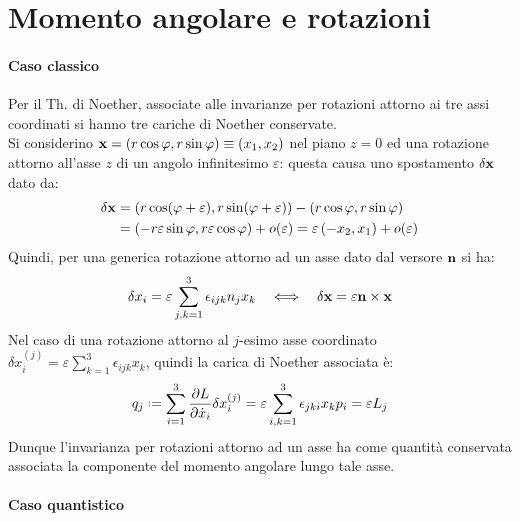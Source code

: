 
\section{Momento angolare e rotazioni}

\paragraph{Caso classico}

Per il Th. di Noether, associate alle invarianze per rotazioni attorno ai tre assi coordinati si hanno tre cariche di Noether conservate.\\
Si considerino $ \mathbf{x} = \left( r\cos \varphi, r\sin \varphi \right) \equiv \left( x_1, x_2 \right) $ nel piano $ z = 0 $ ed una rotazione attorno all'asse $ z $ di un angolo infinitesimo $ \varepsilon $: questa causa uno spostamento $ \delta\mathbf{x} $ dato da:
\begin{equation*}
	\begin{split}
		\delta\mathbf{x}
		&= \left( r\cos (\varphi + \varepsilon), r\sin (\varphi + \varepsilon) \right) - \left( r\cos \varphi, r\sin \varphi \right)\\
		&= \left( -r \varepsilon \sin \varphi, r \varepsilon \cos \varphi \right) + o(\varepsilon) = \varepsilon \left( -x_2, x_1 \right) + o(\varepsilon)
	\end{split}
\end{equation*}
Quindi, per una generica rotazione attorno ad un asse dato dal versore $ \mathbf{n} $ si ha:
\begin{equation}
	\delta x_i = \varepsilon \sum_{j,k = 1}^{3} \epsilon_{ijk} n_j x_k \quad\Longleftrightarrow\quad \delta\mathbf{x} = \varepsilon \mathbf{n}\times\mathbf{x}
	\label{eq:2.1}
\end{equation}
Nel caso di una rotazione attorno al $ j $-esimo asse coordinato $ \delta x_i^{(j)} = \varepsilon \sum_{k = 1}^{3} \epsilon_{ijk} x_k $, quindi la carica di Noether associata è:
\begin{equation}
	q_j \defeq \sum_{i = 1}^{3} \frac{\pa L}{\pa \dot{x}_i} \delta x_i^{(j)} = \varepsilon \sum_{i,k = 1}^{3} \epsilon_{jki} x_k p_i = \varepsilon L_j
	\label{eq:2.2}
\end{equation}
Dunque l'invarianza per rotazioni attorno ad un asse ha come quantità conservata associata la componente del momento angolare lungo tale asse.

\paragraph{Caso quantistico}

